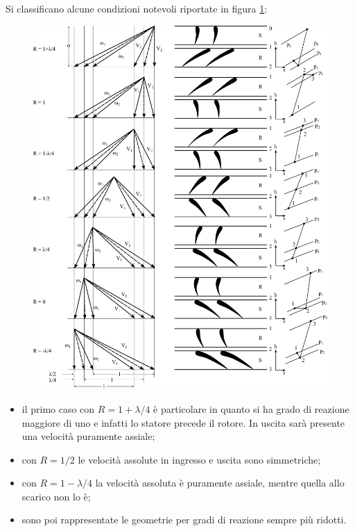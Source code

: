 Si classificano alcune condizioni notevoli riportate in figura \ref{fig:ComprAssTab}:
\begin{figure}
\centering
  \includegraphics[width=1.2\textwidth]{fig/ComprAssTab.pdf}
\caption{}
\label{fig:ComprAssTab}
\end{figure}
\begin{itemize}
	\item il primo caso con $R = 1 + \lambda /4$ è particolare in quanto si ha grado di reazione maggiore di uno e infatti lo statore precede il rotore. In uscita sarà presente una velocità puramente assiale;

	\item con $R = 1/2$ le velocità assolute in ingresso e uscita sono simmetriche;

	\item con $R = 1 - \lambda/4$ la velocità assoluta è puramente assiale, mentre quella allo scarico non lo è;

	\item sono poi rappresentate le geometrie per gradi di reazione sempre più ridotti. 
\end{itemize}

